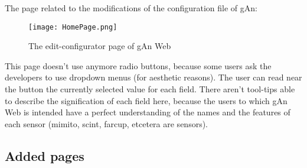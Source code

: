 The page related to the modifications of the configuration file of gAn:

\begin{figure}[H]
\centering
\texttt{[image: HomePage.png]} 
\caption{The edit-configurator page of gAn Web}
\end{figure}

This page doesn't use anymore radio buttons, because some users ask the developers to use dropdown menus (for aesthetic reasons). The user can read near the button the currently selected value for each field. There aren't tool-tips able to describe the signification of each field here, because the users to which gAn Web is intended have a perfect understanding of the names and the features of each sensor (mimito, scint, farcup, etcetera are sensors).  





\subsection{Added pages}
